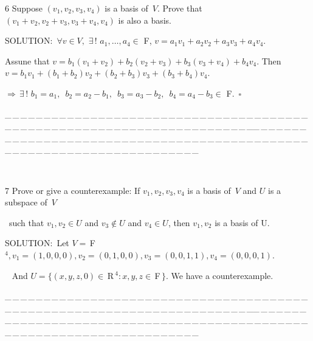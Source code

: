 \documentclass[a4paper, 11pt, UTF8]{article}
\def\Fbf{$\,{\timesbf F}\,$}
\def\Rbf{$\,{\timesbf R}\,$}
\def\Fbfc{$\,{\timesbf F}$}
\begin{document}
\begin{large}
{\timesbf\Large 6} {\timessl\Large 
Suppose $(v_1,v_2,v_3,v_4)$ is a basis of \,$V$. Prove that
$(v_1+v_2,v_2+v_3,v_3+v_4,v_4)$ is also a basis.
}\par
{\timesbf S\footnotesize{OLUTION:}}\,\,\,$\forall v\in V,\,\,\exists\,!\,\,a_1,\dots,a_4\in$ {\timesbf F}, $v=a_1 v_1+a_2 v_2+a_3 v_3+a_4 v_4.$\par\quad
Assune that $v=b_1(v_1+v_2)+b_2(v_2+v_3)+b_3(v_3+v_4)+b_4 v_4$. Then $v=b_1 v_1+(b_1+b_2)v_2+(b_2+b_3)v_3+(b_3+b_4)v_4$.\par\quad
$\Rightarrow\,\exists\,!\,\,b_1=a_1,\,\,\,b_2=a_2-b_1,\,\,\,b_3=a_3-b_2,\,\,\,b_4=a_4-b_3\in$ {\timesbf F}.$\,\,\,\square$
\par
{\tiny \_\,\_\,\_\,\_\,\_\,\_\,\_\,\_\,\_\,\_\,\_\,\_\,\_\,\_\,\_\,\_\,\_\,\_\,\_\,\_\,\_\,\_\,\_\,\_\,\_\,\_\,\_\,\_\,\_\,\_\,\_\,\_\,\_\,\_\,\_\,\_\,\_\,\_\,\_\,\_\,\_\,\_\,\_\,\_\,\_\,\_\,\_\,\_\,\_\,\_\,\_\,\_\,\_\,\_\,\_\,\_\,\_\,\_\,\_\,\_\,\_\,\_\,\_\,\_\,\_\,\_\,\_\,\_\,\_\,\_\,\_\_\,\_\,\_\,\_\,\_\,\_\,\_\,\_\,\_\,\_\,\_\,\_\,\_\,\_\,\_\,\_\,\_\,\_\,\_\,\_\,\_\,\_\,\_\,\_\,\_\,\_\,\_\,\_\,\_\,\_\,\_\,\_\,\_\,\_\,\_\,\_\,\_\,\_\,\_\,\_\,\_\,\_\,\_\,\_\,\_\,\_\,\_\,\_\,\_\,\_\,\_\,\_\,\_\,\_\,\_\,\_\,\_\,\_\,\_\,\_\,\_\,\_\,\_\,\_\,\_\,\_\,\_\,\_\,\_\,\_\,\_}{\tiny\,\par}

{\timesbf\Large 7} {\timessl\Large 
Prove or give a counterexample: If $v_1,v_2,v_3,v_4$ is a basis of \,$V$ and $U$ is a subspace of \,$V$}\par\quad\,
{\timessl\Large such that $v_1,v_2\in U$ and $v_3\not\in U$ and $v_4\in U$, then $v_1,v_2$ is a basis of U.}\par
{\timesbf S\footnotesize{OLUTION:}}\,\,\,Let $V=\Fbfc^4,v_1=(1,0,0,0),v_2=(0,1,0,0),v_3=(0,0,1,1),v_4=(0,0,0,1).$\par\qquad\quad\quad\,\,\,
And $U=\{(x,y,z,0)\in\Rbf^4:x,y,z\in\Fbf\}$. We have a counterexample.\par
{\tiny \_\,\_\,\_\,\_\,\_\,\_\,\_\,\_\,\_\,\_\,\_\,\_\,\_\,\_\,\_\,\_\,\_\,\_\,\_\,\_\,\_\,\_\,\_\,\_\,\_\,\_\,\_\,\_\,\_\,\_\,\_\,\_\,\_\,\_\,\_\,\_\,\_\,\_\,\_\,\_\,\_\,\_\,\_\,\_\,\_\,\_\,\_\,\_\,\_\,\_\,\_\,\_\,\_\,\_\,\_\,\_\,\_\,\_\,\_\,\_\,\_\,\_\,\_\,\_\,\_\,\_\,\_\,\_\,\_\,\_\,\_\_\,\_\,\_\,\_\,\_\,\_\,\_\,\_\,\_\,\_\,\_\,\_\,\_\,\_\,\_\,\_\,\_\,\_\,\_\,\_\,\_\,\_\,\_\,\_\,\_\,\_\,\_\,\_\,\_\,\_\,\_\,\_\,\_\,\_\,\_\,\_\,\_\,\_\,\_\,\_\,\_\,\_\,\_\,\_\,\_\,\_\,\_\,\_\,\_\,\_\,\_\,\_\,\_\,\_\,\_\,\_\,\_\,\_\,\_\,\_\,\_\,\_\,\_\,\_\,\_\,\_\,\_\,\_\,\_\,\_\,\_}\par


\end{large}
\end{document}
